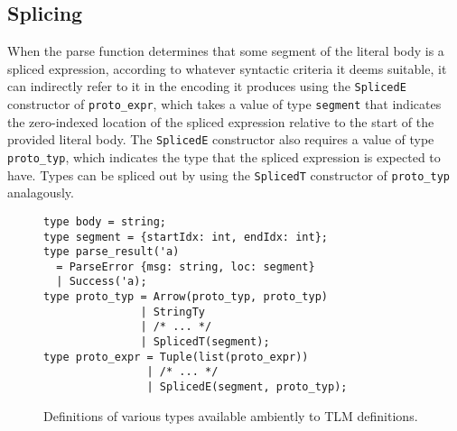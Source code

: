 \documentclass[acmsmall,review,anonymous]{acmart}\settopmatter{printfolios=true,printccs=false,printacmref=false}
\newcommand{\li}[1]{\lstinline[basicstyle=\ttfamily\fontsize{9pt}{1em}\selectfont]{#1}}
\begin{document}
\subsection{Splicing}\label{sec:splicing-and-hygiene}
When the parse function determines that some segment of the literal body is a spliced expression, according to whatever syntactic criteria it deems suitable, it can indirectly refer to it in the encoding it produces using the \li{SplicedE} constructor of \li{proto_expr}, which takes a value of type \li{segment} that indicates the zero-indexed location of the spliced expression relative to the start of the provided literal body. The \li{SplicedE} constructor also requires a value of type \li{proto_typ}, which indicates the type that the spliced expression is expected to have. Types can be spliced out by using the \li{SplicedT} constructor of \li{proto_typ} analagously.

\begin{figure}
\begin{lstlisting}[numbers=none,xleftmargin=0pt]
type body = string;
type segment = {startIdx: int, endIdx: int};
type parse_result('a) 
  = ParseError {msg: string, loc: segment}
  | Success('a);
type proto_typ = Arrow(proto_typ, proto_typ)
               | StringTy
               | /* ... */ 
               | SplicedT(segment);
type proto_expr = Tuple(list(proto_expr))
                | /* ... */
                | SplicedE(segment, proto_typ);
\end{lstlisting}
\caption[Definitions of various types used by TLM definitions.]{Definitions of various types available ambiently to TLM definitions.}
\label{fig:indexrange-and-parseresult}
\label{fig:candidate-exp-Reason}
\end{figure}
\end{document}

